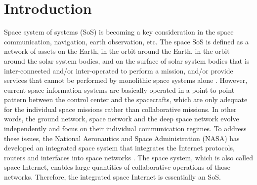 \documentclass[draftclsnofoot,onecolumn,11pt]{IEEEtran}
\begin{document}
\section{Introduction}
%
%
%
%
Space system of systems (SoS) \cite{jamshidi2011system} is becoming a key consideration in the space communication, navigation, earth observation, etc.
The space SoS is defined as a network of assets on the Earth, in the orbit around the Earth, in the orbit around the solar system bodies, and on the surface of solar system bodies that is inter-connected and/or inter-operated to perform a mission, and/or provide services that cannot be performed by monolithic space systems alone \cite{bhasin2008communication}.
However, current space information systems are basically operated in a point-to-point pattern between the control center and the spacecrafts, which are only adequate for the individual space missions rather than collaborative missions. In other words, the ground network, space network and the deep space network evolve independently and focus on their individual communication regimes.
To address these issues, the National Aeronautics and Space Administration (NASA) has developed an integrated space system that integrates the Internet protocols, routers and interfaces into space
networks \cite{hu2013aggregation} \cite{bhasin2008architecting}. The space system, which is also called space Internet, enables large quantities of collaborative operations of those networks. Therefore, the integrated space Internet is essentially an SoS.
\end{document}
